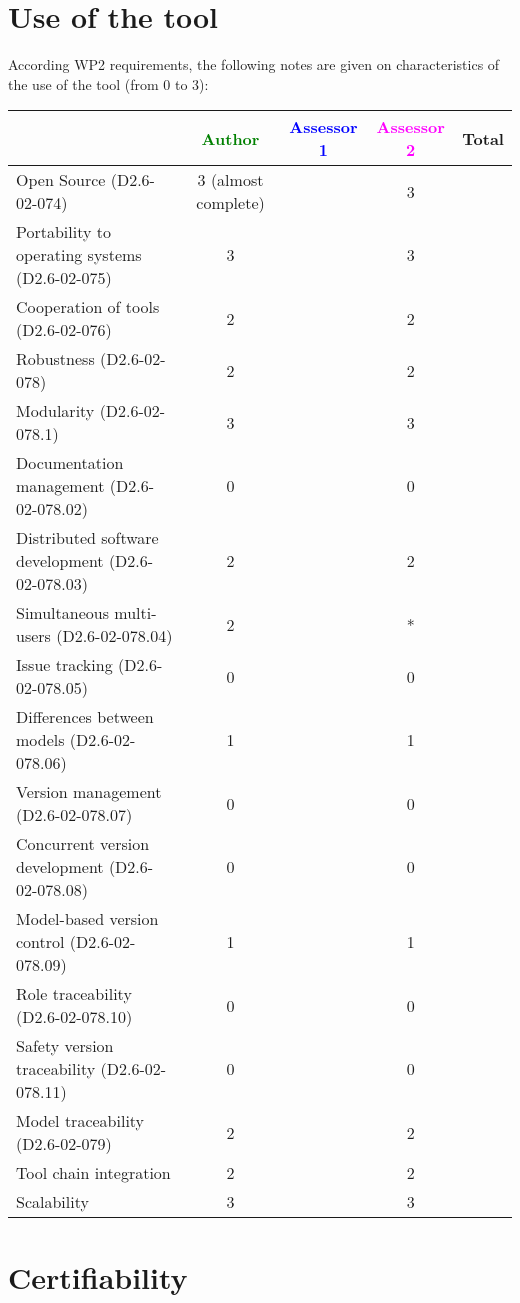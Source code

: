 \section{Use of the tool}


According WP2 requirements, the following notes are given on characteristics of the use of the tool (from 0 to 3):

\begin{tabular}{|l | c | c | c | c|}
\hline
& \textcolor{green}{Author} & \textcolor{blue}{Assessor 1} & \textcolor{magenta}{Assessor 2} & Total \\
\hline 
Open Source (D2.6-02-074) & 3 (almost complete)& & 3 &  \\
\hline 
Portability to operating systems (D2.6-02-075) & 3 & & 3 &  \\
\hline
Cooperation of tools (D2.6-02-076) & 2 & & 2 &  \\
\hline
Robustness (D2.6-02-078) & 2 & & 2 & \\
\hline
Modularity (D2.6-02-078.1) & 3 & & 3 & \\
\hline
Documentation management (D2.6-02-078.02) & 0 & & 0 & \\
\hline
Distributed software development (D2.6-02-078.03)  & 2 & & 2 & \\
\hline
Simultaneous multi-users (D2.6-02-078.04)   & 2 & & * & \\
\hline
Issue tracking (D2.6-02-078.05) & 0 & & 0 & \\
\hline
Differences between models (D2.6-02-078.06) & 1 & & 1 & \\
\hline
Version management (D2.6-02-078.07) & 0 & & 0 & \\
\hline
Concurrent version development (D2.6-02-078.08) & 0 & & 0 & \\
\hline
Model-based version control (D2.6-02-078.09) & 1 & & 1 & \\
\hline
Role traceability (D2.6-02-078.10) & 0 & & 0 & \\
\hline
Safety version traceability (D2.6-02-078.11) & 0 & & 0 & \\
\hline
Model traceability (D2.6-02-079) & 2 & & 2 & \\
\hline
Tool chain integration & 2 & & 2 & \\
\hline
Scalability & 3 & & 3 & \\
\hline
\end{tabular}

\section{Certifiability}

